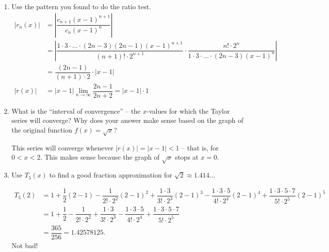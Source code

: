 \documentclass[10pt]{article}
\newenvironment{red}{\color{red}}{\ignorespacesafterend}
\begin{document}
\begin{enumerate}[leftmargin=0pt]
\begin{enumerate}
    \begin{red}
        In the numerator we have an alternator $(-1)^{k+1}$ and the product of odd numbers. (If you want to read about ``double factorials'' that may be fun!) In the denominator we have a factorial and a power of 2:
        \[c_k = (-1)^{k+1}\dfrac{1\cdot 3 \cdot \ldots \cdot (2k-3)}{k!\cdot 2^k}.\]
    \end{red}
    \item Use the pattern you found to do the ratio test.
    \begin{red}
    \begin{align*}
        |r_n(x)| &= \left| \dfrac{c_{n+1}(x-1)^{n+1}}{c_n (x-1)^n} \right| \\
        &= \left|
        \dfrac{1\cdot 3\cdot \ldots\cdot(2n-3)(2n-1) (x-1)^{n+1}}{(n+1)!\cdot 2^{n+1}} \cdot        
        \dfrac{n!\cdot 2^n}{1\cdot 3\cdot \ldots\cdot(2n-3) (x-1)^n}
        \right| \\
        &= \dfrac{(2n-1)}{(n+1)\cdot 2}\cdot |x-1| \\
        |r(x)| &= |x-1| \lim_{n\to \infty} \dfrac{2n-1}{2n+2} = |x-1|\cdot 1
    \end{align*}
    \end{red}
    
    \item What is the ``interval of convergence'' -- the $x$-values for which the Taylor series will converge? Why does your answer make sense based on the graph of the original function $f(x) = \sqrt{x}$?

    \begin{red}
        This series will converge whenever $|r(x)| = |x-1| < 1$ -- that is, for $0 < x < 2$. This makes sense because the graph of $\sqrt{x}$ stops at $x=0$.
    \end{red}
    \item Use $T_5(x)$ to find a good fraction approximation for $\sqrt{2} \approx 1.414\ldots$

    \begin{red}
        \begin{align*}
            T_5(2) &= 1 
        + \dfrac12 (2-1) 
        - \dfrac{1}{2!\cdot 2^2}(2-1)^2
        + \dfrac{1\cdot 3}{3!\cdot 2^3}(2-1)^3 
        - \dfrac{1\cdot3 \cdot 5}{4!\cdot 2^4}(2-1)^4
        + \dfrac{1\cdot3 \cdot 5\cdot 7}{5!\cdot 2^5}(2-1)^5 \\
        &= 1 
        + \dfrac12 
        - \dfrac{1}{2!\cdot 2^2}
        + \dfrac{1\cdot 3}{3!\cdot 2^3}
        - \dfrac{1\cdot3 \cdot 5}{4!\cdot 2^4}
        + \dfrac{1\cdot3 \cdot 5\cdot 7}{5!\cdot 2^5} \\
        &= \dfrac{365}{256} = 1.42578125.
        \end{align*}
        Not bad!
    \end{red}
\end{enumerate}

    

\end{enumerate}
\end{document}
